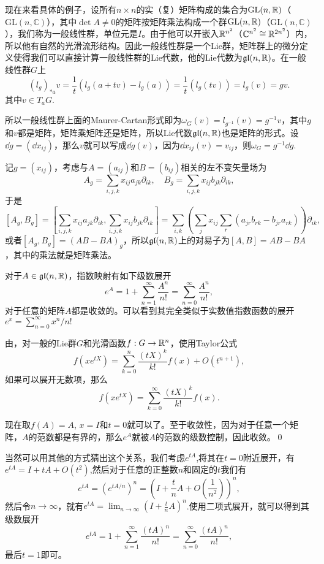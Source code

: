 \documentclass[9pt]{extarticle}
\newcommand{\cc}{\mathbb{C}}
\begin{document}
\para 现在来看具体的例子，设所有$n\times n$的实（复）矩阵构成的集合为$\mathrm{GL}(n,\mathbb{R})$（$\mathrm{GL}(n,\cc)$），其中$\det A\neq 0$的矩阵按矩阵乘法构成一个群$\mathrm{GL}(n,\mathbb{R})$（$\mathrm{GL}(n,\cc)$），我们称为一般线性群，单位元是$I$。由于他可以开嵌入$\mathbb{R}^{n^2}$（$\cc^{n^2}\cong \rr^{2n^2}$）内，所以他有自然的光滑流形结构。因此一般线性群是一个Lie群，矩阵群上的微分定义使得我们可以直接计算一般线性群的Lie代数，他的Lie代数为$\mathfrak{gl}(n,\mathbb{R})$。在一般线性群$G$上
\[
	(l_g)_{*a}v=\frac{1}{t}(l_g(a+tv)-l_g(a))
	=\frac{1}{t}(l_g(tv))=l_g(v)=gv.
\]
其中$v\in T_aG$.

所以一般线性群上面的Maurer-Cartan形式即为$\omega_G(v)=l_{g^{-1}}(v)=g^{-1}v$，其中$g$和$v$都是矩阵，矩阵乘矩阵还是矩阵，所以Lie代数$\mathfrak{gl}(n,\mathbb{R})$也是矩阵的形式。设$\dd g=(\dd x_{ij})$，那么$v$就可以写成$\dd g(v)$，因为$\dd x_{ij}(v)=v_{ij}$，则$\omega_G=g^{-1}\dd g$.


记$g=(x_{ij})$，考虑与$A=(a_{ij})$和$B=(b_{ij})$相关的左不变矢量场为
\[
A_g=\sum_{i,j,k}x_{ij}a_{jk}\partial_{ik},\quad B_g=\sum_{i,j,k}x_{ij}b_{jk}\partial_{ik},
\]
于是
\[
[A_g,B_g]=\left[\sum_{i,j,k}x_{ij}a_{jk}\partial_{ik},\sum_{i,j,k}x_{ij}b_{jk}\partial_{ik}\right]=\sum_{i,k}\left(\sum_{j}x_{ij}\sum_{r}(a_{jr}b_{rk}-b_{jr}a_{rk})\right)\partial_{ik},
\]
或者$[A_g,B_g]=(AB-BA)_g$，所以$\mathfrak{gl}(n,\mathbb{R})$上的对易子为$[A,B]=AB-BA$，其中的乘法就是矩阵乘法。

\para 对于$A\in\mathfrak{gl}(n,\mathbb{R})$，指数映射有如下级数展开
\[
	e^A=1+\sum_{n=1}^\infty \frac{A^n}{n!}=\sum_{n=0}^\infty \frac{A^n}{n!},
\]
对于任意的矩阵$A$都是收敛的。可以看到其完全类似于实数值指数函数的展开$e^x=\sum_{n=0}^\infty x^n/n!$

\proof 由，对一般的Lie群$G$和光滑函数$f:G\to \mathbb{R}^n$，使用Taylor公式
\[
	f(xe^{tX})=\sum_{k=0}^n\frac{(tX)^{k}}{k!}f(x)+O(t^{n+1}),
\]
如果可以展开无数项，那么
\[
	f(xe^{tX})=\sum_{k=0}^\infty\frac{(tX)^{k}}{k!}f(x).
\]

现在取$f(A)=A$, $x=I$和$t=0$就可以了。至于收敛性，因为对于任意一个矩阵，$A$的范数都是有界的，那么$e^A$就被$A$的范数的级数控制，因此收敛。\qed

当然可以用其他的方式猜出这个关系，我们考虑$e^{tA}$,将其在$t=0$附近展开，有$e^{tA}=I+tA+O(t^2)$,然后对于任意的正整数$n$和固定的$t$我们有
\[
	e^{tA}=\left(e^{tA/n}\right)^n=\left(I+\frac{t}{n}A+O\left(\frac{1}{n^2}\right)\right)^n,
\]
然后令$n\to\infty$，就有$e^{tA}=\lim_{n\to\infty}\left(I+\frac{t}{n}A\right)^n$.使用二项式展开，就可以得到其级数展开
\[
	e^{tA}=1+\sum_{n=1}^\infty \frac{(tA)^n}{n!}=\sum_{n=0}^\infty \frac{(tA)^n}{n!},
\]
最后$t=1$即可。
\end{document}
